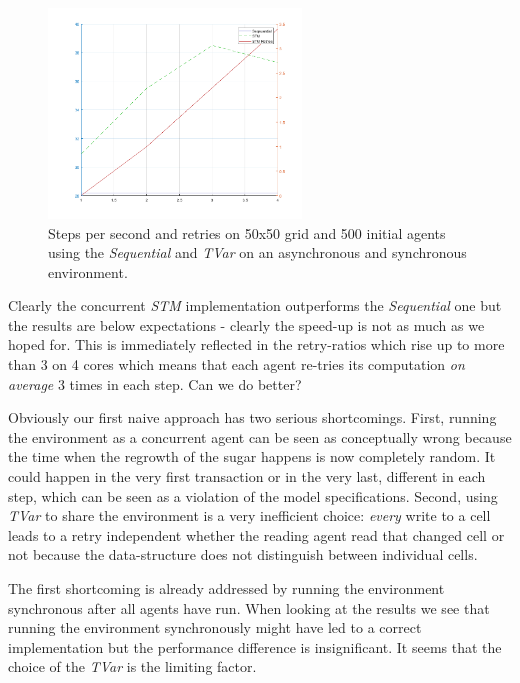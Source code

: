 \begin{figure}
	\centering
	\includegraphics[width=0.6\textwidth, angle=0]{./fig/sugarscape/tvar_concenv_500_50x50.png}
	\caption{Steps per second and retries on 50x50 grid and 500 initial agents using the \textit{Sequential} and \textit{TVar} on an asynchronous and synchronous environment.}
	\label{fig:naive_results_time}
\end{figure}

Clearly the concurrent \textit{STM} implementation outperforms the \textit{Sequential} one but the results are below expectations - clearly the speed-up is not as much as we hoped for. This is immediately reflected in the retry-ratios which rise up to more than 3 on 4 cores which means that each agent re-tries its computation \textit{on average} 3 times in each step. Can we do better?

Obviously our first naive approach has two serious shortcomings. First, running the environment as a concurrent agent can be seen as conceptually wrong because the time when the regrowth of the sugar happens is now completely random. It could happen in the very first transaction or in the very last, different in each step, which can be seen as a violation of the model specifications. Second, using \textit{TVar} to share the environment is a very inefficient choice: \textit{every} write to a cell leads to a retry independent whether the reading agent read that changed cell or not because the data-structure does not distinguish between individual cells.

The first shortcoming is already addressed by running the environment synchronous after all agents have run. When looking at the results we see that running the environment synchronously might have led to a correct implementation but the performance difference is insignificant. It seems that the choice of the \textit{TVar} is the limiting factor. 

